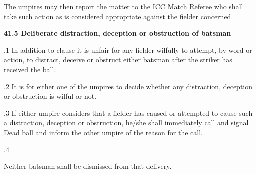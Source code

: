 \documentclass[12pt]{article}
\begin{document}
\vspace{\baselineskip}
\begin{adjustwidth}{0.5in}{0.57in}
{\fontsize{9pt}{10.8pt}\selectfont The umpires may then report the matter to the ICC Match Referee who shall take such action as is considered appropriate against the fielder concerned.\par}\par

\end{adjustwidth}


\vspace{\baselineskip}
{\fontsize{11pt}{13.2pt}\selectfont \textbf{41.5 \tabto{0.47in} Deliberate distraction, deception or obstruction of batsman}\par}\par


\vspace{\baselineskip}
\begin{adjustwidth}{0.5in}{0.08in}
{\fontsize{9pt}{10.8pt}.1 \tabto{0.49in} In addition to clause it is unfair for any fielder wilfully to attempt, by word or action, to distract, deceive or obstruct either batsman after the striker has received the ball.\par}\par

\end{adjustwidth}


\vspace{\baselineskip}
{\fontsize{9pt}{10.8pt}.2 \tabto{0.49in} It is for either one of the umpires to decide whether any distraction, deception or obstruction is wilful or not.\par}\par


\vspace{\baselineskip}
\begin{adjustwidth}{0.5in}{0.04in}
{\fontsize{9pt}{10.8pt}.3 \tabto{0.49in} If either umpire considers that a fielder has caused or attempted to cause such a distraction, deception or obstruction, he/she shall immediately call and signal Dead ball and inform the other umpire of the reason for the call.\par}\par

\end{adjustwidth}


\vspace{\baselineskip}
{\fontsize{9pt}{10.8pt}.4 \tabto{0.49in} {\fontsize{8pt}{9.6pt}\selectfont Neither batsman shall be dismissed from that delivery.\par}\par}\par
\end{document}
